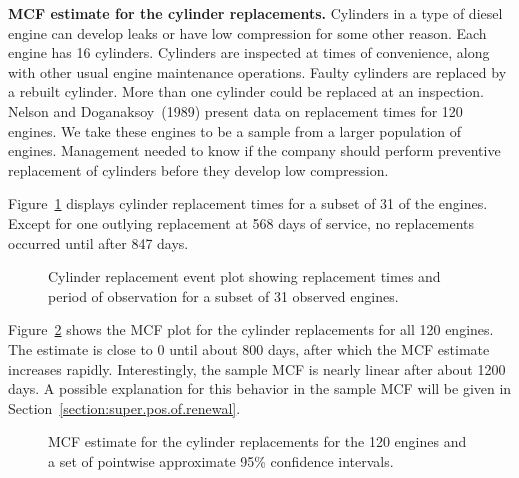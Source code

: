 \begin{example}
\label{example:mcf.cylinder}
{\bf MCF estimate for the cylinder replacements.} Cylinders in a
type of diesel engine can develop leaks or have low compression for
some other reason.  Each engine has 16 cylinders. Cylinders are
inspected at times of convenience, along with other usual engine
maintenance operations. Faulty cylinders are replaced by a rebuilt
cylinder.  More than one cylinder could be replaced at an
inspection.  Nelson and Doganaksoy~(1989) present data on
replacement times for 120 engines.  We take these engines to be a
sample from a larger population of engines.  Management needed to
know if the company should perform preventive replacement of
cylinders before they develop low compression.

Figure~\ref{figure:cylinder.event.plot.ps} displays
cylinder replacement times for a subset of 31 of the engines.  Except
for one outlying replacement at 568 days of service, no replacements occurred
until after 847 days.
\begin{figure}
\caption{Cylinder replacement event plot showing replacement times
and period of observation for a subset of 31 observed engines.}
\label{figure:cylinder.event.plot.ps}
\end{figure}
Figure~\ref{figure:cylinder.mcf.plot.ps} shows the MCF plot for the
cylinder replacements for all 120 engines. The estimate is close to
0 until about 800 days, after which the MCF estimate increases
rapidly.  Interestingly, the sample MCF is nearly linear after about
1200 days.  A possible explanation for this behavior in the sample
MCF will be given in Section~\ref{section:super.pos.of.renewal}.
\begin{figure}
\caption{MCF estimate for the cylinder replacements for the 120
engines
and a set of pointwise approximate 95\% confidence intervals.}
\label{figure:cylinder.mcf.plot.ps}
\end{figure}
\end{example}

